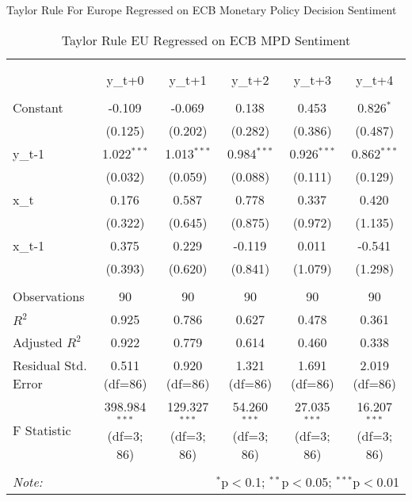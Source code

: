 \documentclass[12pt, letterpaper]{article}
\begin{document}
Taylor Rule For Europe Regressed on ECB Monetary Policy Decision Sentiment

\begin{table}[H] \centering
  \caption{Taylor Rule EU Regressed on ECB MPD Sentiment}
\begin{tabular}{@{\extracolsep{5pt}}lccccc}
\\[-1.8ex]\hline
\hline \\[-1.8ex]
\\[-1.8ex] & \multicolumn{1}{c}{y_{t+0}} & \multicolumn{1}{c}{y_{t+1}} & \multicolumn{1}{c}{y_{t+2}} & \multicolumn{1}{c}{y_{t+3}} & \multicolumn{1}{c}{y_{t+4}}  \\
\hline \\[-1.8ex]
 Constant & -0.109$^{}$ & -0.069$^{}$ & 0.138$^{}$ & 0.453$^{}$ & 0.826$^{*}$ \\
& (0.125) & (0.202) & (0.282) & (0.386) & (0.487) \\
 y_{t-1} & 1.022$^{***}$ & 1.013$^{***}$ & 0.984$^{***}$ & 0.926$^{***}$ & 0.862$^{***}$ \\
& (0.032) & (0.059) & (0.088) & (0.111) & (0.129) \\
 x_{t} & 0.176$^{}$ & 0.587$^{}$ & 0.778$^{}$ & 0.337$^{}$ & 0.420$^{}$ \\
& (0.322) & (0.645) & (0.875) & (0.972) & (1.135) \\
 x_{t-1} & 0.375$^{}$ & 0.229$^{}$ & -0.119$^{}$ & 0.011$^{}$ & -0.541$^{}$ \\
& (0.393) & (0.620) & (0.841) & (1.079) & (1.298) \\
\hline \\[-1.8ex]
 Observations & 90 & 90 & 90 & 90 & 90 \\
 $R^2$ & 0.925 & 0.786 & 0.627 & 0.478 & 0.361 \\
 Adjusted $R^2$ & 0.922 & 0.779 & 0.614 & 0.460 & 0.338 \\
 Residual Std. Error & 0.511 (df=86) & 0.920 (df=86) & 1.321 (df=86) & 1.691 (df=86) & 2.019 (df=86) \\
 F Statistic & 398.984$^{***}$ (df=3; 86) & 129.327$^{***}$ (df=3; 86) & 54.260$^{***}$ (df=3; 86) & 27.035$^{***}$ (df=3; 86) & 16.207$^{***}$ (df=3; 86) \\
\hline
\hline \\[-1.8ex]
\textit{Note:} & \multicolumn{5}{r}{$^{*}$p$<$0.1; $^{**}$p$<$0.05; $^{***}$p$<$0.01} \\
\end{tabular}
\end{table}
\end{document}

